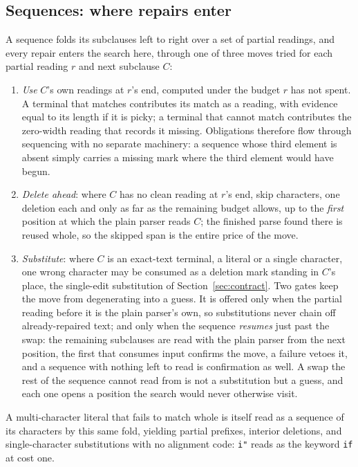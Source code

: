 \documentclass[manuscript]{acmart}
\newcommand{\cd}[1]{\texttt{#1}}
\begin{document}
\subsection{Sequences: where repairs enter}
\label{sec:slots}

A sequence folds its subclauses left to right over a set of partial readings, and every repair enters the search here, through one of three moves tried for each partial reading $r$ and next subclause $C$:
\begin{enumerate}
    \item \emph{Use} $C$'s own readings at $r$'s end, computed under the budget $r$ has not spent. A terminal that matches contributes its match as a reading, with evidence equal to its length if it is picky; a terminal that cannot match contributes the zero-width reading that records it missing. Obligations therefore flow through sequencing with no separate machinery: a sequence whose third element is absent simply carries a missing mark where the third element would have begun.
    \item \emph{Delete ahead}: where $C$ has no clean reading at $r$'s end, skip characters, one deletion each and only as far as the remaining budget allows, up to the \emph{first} position at which the plain parser reads $C$; the finished parse found there is reused whole, so the skipped span is the entire price of the move.
    \item \emph{Substitute}: where $C$ is an exact-text terminal, a literal or a single character, one wrong character may be consumed as a deletion mark standing in $C$'s place, the single-edit substitution of Section~\ref{sec:contract}. Two gates keep the move from degenerating into a guess. It is offered only when the partial reading before it is the plain parser's own, so substitutions never chain off already-repaired text; and only when the sequence \emph{resumes} just past the swap: the remaining subclauses are read with the plain parser from the next position, the first that consumes input confirms the move, a failure vetoes it, and a sequence with nothing left to read is confirmation as well. A swap the rest of the sequence cannot read from is not a substitution but a guess, and each one opens a position the search would never otherwise visit.
\end{enumerate}
A multi-character literal that fails to match whole is itself read as a sequence of its characters by this same fold, yielding partial prefixes, interior deletions, and single-character substitutions with no alignment code: \cd{i"} reads as the keyword \cd{if} at cost one.
\end{document}
